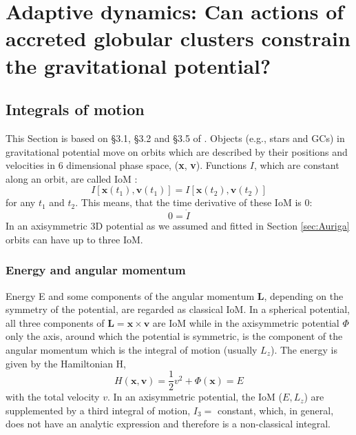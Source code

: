 \section[Adaptive dynamics]{Adaptive dynamics: Can actions of accreted globular clusters constrain the gravitational potential?}\label{sec:Dynamics}

\subsection{Integrals of motion}\label{subsec:IoMs}
This Section is based on \S3.1, \S3.2 and \S3.5 of \citet{Binney...Tremaine...2008}. Objects (e.g., stars and \acp{GC}) in gravitational potential move on orbits which are described by their positions and velocities in 6 dimensional phase space, (\textbf{x}, \textbf{v}). Functions $I$, which are constant along an orbit, are called \acf{IoM} \citep{Binney...Tremaine...2008}:
\begin{equation}
    I[\mathbf{x}(t_1), \mathbf{v}(t_1)] = I[\mathbf{x}(t_2), \mathbf{v}(t_2)]
\end{equation}
for any $t_1$ and $t_2$. This means, that the time derivative of these \ac{IoM} is 0:
\begin{equation}\label{eq:der_IoM}
    0 = \dot{I}
\end{equation}
In an axisymmetric 3D potential as we assumed and fitted in Section \ref{sec:Auriga} orbits can have up to three \ac{IoM}. 
\subsubsection{Energy and angular momentum}
Energy E and some components of the angular momentum \textbf{L}, depending on the symmetry of the potential, are regarded as classical \ac{IoM}. In a spherical potential, all three components of $\textbf{L} = \textbf{x} \times \textbf{v}$ are \ac{IoM} while in the axisymmetric potential $\Phi$ only the axis, around which the potential is symmetric, is the component of the angular momentum which is the integral of motion (usually $L_z$). The energy is given by the Hamiltonian H,
\begin{equation}\label{eq:energy_hamiltonian}
    H(\mathbf{x, v}) = \frac{1}{2}v^2 + \Phi(\mathbf{x}) = E
\end{equation}
with the total velocity $v$. In an axisymmetric potential, the \ac{IoM} ($E,L_z$) are supplemented by a third integral of motion, $I_3 =$ constant, which, in general, does not have an analytic expression and therefore is a non-classical integral. 

